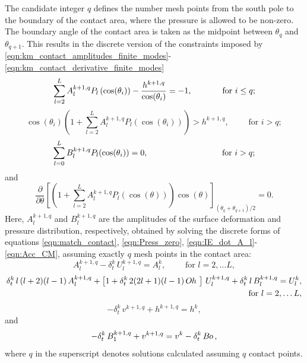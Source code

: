 \documentclass{jfm}
\newcommand{\Bo}{B\kern-0.05em o\,}
\newcommand{\Oh}{O\kern-0.05em h\,}
\begin{document}
The candidate integer $q$ defines the number mesh points from the south pole to the boundary of the contact area, where the pressure is allowed to be non-zero. The boundary angle of the contact area is taken as the midpoint between $\theta_q$ and $\theta_{q+1}$. This results in the discrete version of the constraints imposed by \eqref{eqn:km_contact_amplitudes_finite_modes}-\eqref{eqn:km_contact_derivative_finite_modes}
\begin{equation}\label{eqn:match_contact}
    \sum\limits_{l=2}^{L} {A_l^{k+1, q}P_l\left(\cos(\theta_i)\right)} - \frac{h^{k+1, q}}{\cos(\theta_i)} = -1,
    \qquad \hspace{4.6 mm} \text{ for } i \leq q; %
\end{equation}
\begin{equation}\label{eqn:no_contact}
    \cos(\theta_i)\left(1+\sum\limits_{l=2}^{L} {A_l^{k+1, q}P_l\left(\cos(\theta_i)\right)}\right) > h^{k+1, q},
    \qquad \text{ for } i > q;%
\end{equation}
\begin{equation}\label{eqn:Press_zero}
    \sum\limits_{l=0}^{L} {B_l^{k+1, q}P_l(\cos(\theta_i))} = 0, \qquad \hspace{23.2 mm} \text{ for } i > q; %
\end{equation}
and
\begin{equation}\label{eqn:tan_cond_q}
    \frac{\partial}{\partial \theta}\left[\left(1+\sum\limits_{l=2}^L {A_l^{k+1,q}P_l(\cos(\theta))}\right)\cos(\theta)\right]_{\left(\theta_q+\theta_{q+1}\right)/2} = 0. %
\end{equation}
Here, $A_l^{k+1,q}$ and $B_l^{k+1,q}$ are the amplitudes of the surface deformation and pressure distribution, respectively, obtained by solving the discrete forms of equations \eqref{eqn:match_contact}, \eqref{eqn:Press_zero}, \eqref{eqn:IE_dot_A_l}-\eqref{eqn:Acc_CM}, assuming exactly $q$ mesh points in the contact area:
\begin{equation}\label{eqn:IE_dot_A_l}
    A^{k+1, q}_l -\delta_t^k \, U^{k+1, q}_l = A^k_l, \qquad \text{ for } l = 2, \ldots L,
\end{equation}
\begin{equation}\label{eqn:Euler_mode_speed}
\begin{aligned}
    \delta^k_t\, l \, (l+2)(l-1) \, A^{k+1, q}_l + \left[1 + \delta^k_t \, 2(2l+1)(l-1) \, \Oh \, \right] \, {U}_l^{k+1, q} + \delta^k_t \, l \, B_l^{k+1, q} =U^k_l,& \\ \text{ for } l = 2, \ldots L,&
\end{aligned}
\end{equation}
\begin{equation}\label{eqn:acc_cm_q}
    - \delta_t^k \, v^{k+1, q} + h^{k+1, q} = h^{k},
\end{equation}
and
\begin{equation}\label{eqn:Acc_CM}
    -\delta_t^k \, B_1^{k+1,q} + v^{k+1, q} = v^k -  \delta_t^k \, \Bo,
\end{equation}
where $q$ in the superscript denotes solutions calculated assuming $q$ contact points.
\end{document}
